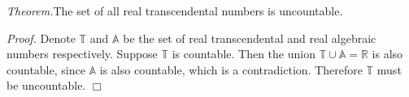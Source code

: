 \documentclass{article}
\begin{document}
\emph{Theorem.}The set of all real transcendental numbers is uncountable.

\emph{Proof.}
Denote $\mathbb{T}$ and $\mathbb{A}$ be the set of real transcendental and real algebraic numbers respectively. Suppose $\mathbb{T}$ is countable. Then the union $\mathbb{T} \cup \mathbb{A} = \mathbb{R}$ is also countable, since $\mathbb{A}$ is also countable, which is a contradiction. Therefore $\mathbb{T}$ must be uncountable. $\Box$ 
\end{document}
